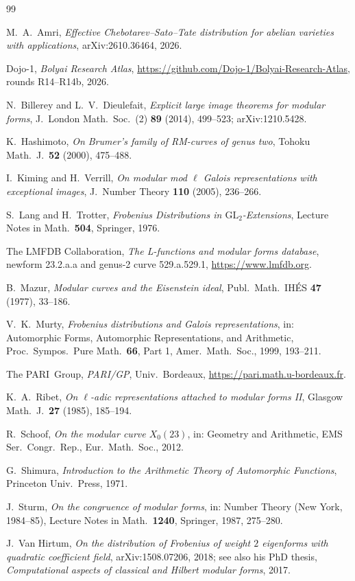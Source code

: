 \documentclass[11pt]{amsart}
\theoremstyle{definition}
\theoremstyle{remark}
\newcommand{\GL}{\mathrm{GL}}
\begin{document}
\begin{thebibliography}{99}

 M.~A.~Amri, \emph{Effective Chebotarev--Sato--Tate distribution for abelian varieties with applications}, arXiv:2610.36464, 2026.

 Dojo-1, \emph{Bolyai Research Atlas}, \url{https://github.com/Dojo-1/Bolyai-Research-Atlas}, rounds R14--R14b, 2026.

 N.~Billerey and L.~V.~Dieulefait, \emph{Explicit large image theorems for modular forms}, J.\ London Math.\ Soc.\ (2) \textbf{89} (2014), 499--523; arXiv:1210.5428.

 K.~Hashimoto, \emph{On Brumer's family of RM-curves of genus two}, Tohoku Math.\ J.\ \textbf{52} (2000), 475--488.

 I.~Kiming and H.~Verrill, \emph{On modular mod $\ell$ Galois representations with exceptional images}, J.\ Number Theory \textbf{110} (2005), 236--266.

 S.~Lang and H.~Trotter, \emph{Frobenius Distributions in $\GL_2$-Extensions}, Lecture Notes in Math.\ \textbf{504}, Springer, 1976.

 The LMFDB Collaboration, \emph{The L-functions and modular forms database}, newform 23.2.a.a and genus-2 curve 529.a.529.1, \url{https://www.lmfdb.org}.

 B.~Mazur, \emph{Modular curves and the Eisenstein ideal}, Publ.\ Math.\ IH\'ES \textbf{47} (1977), 33--186.

 V.~K.~Murty, \emph{Frobenius distributions and Galois representations}, in: Automorphic Forms, Automorphic Representations, and Arithmetic, Proc.\ Sympos.\ Pure Math.\ \textbf{66}, Part 1, Amer.\ Math.\ Soc., 1999, 193--211.

 The PARI~Group, \emph{PARI/GP}, Univ.\ Bordeaux, \url{https://pari.math.u-bordeaux.fr}.

 K.~A.~Ribet, \emph{On $\ell$-adic representations attached to modular forms II}, Glasgow Math.\ J.\ \textbf{27} (1985), 185--194.

 R.~Schoof, \emph{On the modular curve $X_0(23)$}, in: Geometry and Arithmetic, EMS Ser.\ Congr.\ Rep., Eur.\ Math.\ Soc., 2012.

 G.~Shimura, \emph{Introduction to the Arithmetic Theory of Automorphic Functions}, Princeton Univ.\ Press, 1971.

 J.~Sturm, \emph{On the congruence of modular forms}, in: Number Theory (New York, 1984--85), Lecture Notes in Math.\ \textbf{1240}, Springer, 1987, 275--280.

 J.~Van Hirtum, \emph{On the distribution of Frobenius of weight $2$ eigenforms with quadratic coefficient field}, arXiv:1508.07206, 2018; see also his PhD thesis, \emph{Computational aspects of classical and Hilbert modular forms}, 2017.

\end{thebibliography}
\end{document}
